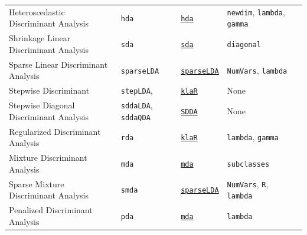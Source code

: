 \documentclass[12pt]{article}
\newcommand{\code}[1]{\mbox{\footnotesize\color{darkblue}\texttt{#1}}}
\begin{document}
\begin{landscape}
\begin{longtable}{lllll}
      Heteroscedastic Discriminant Analysis&
         \code{hda} & 
              {\tt \href{http://cran.r-project.org/web/packages/hda/index.html}{hda}}      &          
            \code{newdim}, \code{lambda}, \code{gamma} & \\  
            
\rowcolor[rgb]{.95, .95, .95}                     
      Shrinkage Linear Discriminant Analysis &
         \code{sda} & 
              {\tt \href{http://cran.r-project.org/web/packages/sda/index.html}{sda}}      &          
            \code{diagonal} & \\  
      
      Sparse Linear Discriminant Analysis&
         \code{sparseLDA} & 
              {\tt \href{http://cran.r-project.org/web/packages/sparseLDA/index.html}{sparseLDA}}      &          
            \code{NumVars}, \code{lambda} & \\  

\rowcolor[rgb]{.95, .95, .95}               
       Stepwise Discriminant&
        \code{stepLDA}, &
         {\tt \href{http://cran.r-project.org/web/packages/klaR/index.html}{klaR}}   &
        None & \\
      
      Stepwise Diagonal Discriminant Analysis&
        \code{sddaLDA}, \code{sddaQDA}&
         {\tt \href{http://cran.r-project.org/web/packages/SDDA/index.html}{SDDA}}&
        None & \\
            
\rowcolor[rgb]{.95, .95, .95}                     
      Regularized Discriminant Analysis &
         \code{rda} & 
             {\tt \href{http://cran.r-project.org/web/packages/klaR/index.html}{klaR}}      & 
            \code{lambda}, \code{gamma} & \\
      
      Mixture Discriminant Analysis &
         \code{mda} & 
             {\tt \href{http://cran.r-project.org/web/packages/mda/index.html}{mda}}        & 
            \code{subclasses} & \\

\rowcolor[rgb]{.95, .95, .95}         
      Sparse Mixture Discriminant Analysis&
         \code{smda} & 
             {\tt \href{http://cran.r-project.org/web/packages/sparseLDA/index.html}{sparseLDA}}        &          
            \code{NumVars}, \code{R}, \code{lambda} & \\  
      
      Penalized Discriminant Analysis &
         \code{pda} & 
             {\tt \href{http://cran.r-project.org/web/packages/mda/index.html}{mda}}      & 
            \code{lambda} & \\
 

\end{longtable}
\end{landscape}
\end{document}
